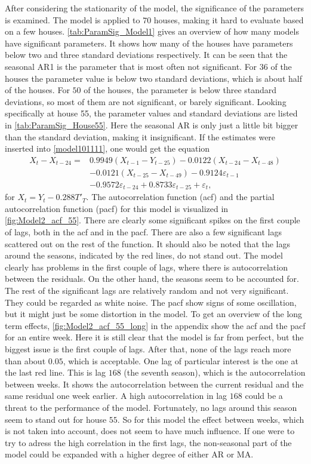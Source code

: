 After considering the stationarity of the model, the significance of the parameters is examined. The model is applied to $70$ houses, making it hard to evaluate based on a few houses. \cref{tab:ParamSig_Model1} gives an overview of how many models have significant parameters. It shows how many of the houses have parameters below two and three standard deviations respectively. It can be seen that the seasonal AR1 is the parameter that is most often not significant. For $36$ of the houses the parameter value is below two standard deviations, which is about half of the houses. For $50$ of the houses, the parameter is below three standard deviations, so most of them are not significant, or barely significant. Looking specifically at house 55, the parameter values and standard deviations are listed in \cref{tab:ParamSig_House55}. Here the seasonal AR is only just a little bit bigger than the standard deviation, making it insignificant. If the estimates were inserted into \cref{model101111}, one would get the equation
\begin{align}
    X_t-X_{t-24} =& 0.9949 (X_{t-1}-Y_{t-25}) - 0.0122 (X_{t-24}-X_{t-48}) \nonumber\\  & - 0.0121  (X_{t-25}-X_{t-49}) - 0.9124 \varepsilon_{t-1} \nonumber\\
    &-0.9572 \varepsilon_{t-24} + 0.8733 \varepsilon_{t-25} + \varepsilon_t,
\end{align}
for $X_t = Y_t - 0.288 T'_T$. The autocorrelation function (acf) and the partial autocorrelation function (pacf) for this model is visualized in \cref{fig:Model2_acf_55}. There are clearly some significant spikes on the first couple of lags, both in the acf and in the pacf. There are also a few significant lags scattered out on the rest of the function. It should also be noted that the lags around the seasons, indicated by the red lines, do not stand out. The model clearly has problems in the first couple of lags, where there is autocorrelation between the residuals. On the other hand, the seasons seem to be accounted for. The rest of the significant lags are relatively random and not very significant. They could be regarded as white noise. The pacf show signs of some oscillation, but it might just be some distortion in the model. To get an overview of the long term effects, \cref{fig:Model2_acf_55_long} in the appendix show the acf and the pacf for an entire week. Here it is still clear that the model is far from perfect, but the biggest issue is the first couple of lags. After that, none of the lags reach more than about $0.05$, which is acceptable. One lag of particular interest is the one at the last red line. This is lag $168$ (the seventh season), which is the autocorrelation between weeks. It shows the autocorrelation between the current residual and the same residual one week earlier. A high autocorrelation in lag $168$ could be a threat to the performance of the model. Fortunately, no lags around this season seem to stand out for house $55$. So for this model the effect between weeks, which is not taken into account, does not seem to have much influence. If one were to try to adress the high correlation in the first lags, the non-seasonal part of the model could be expanded with a higher degree of either AR or MA.
